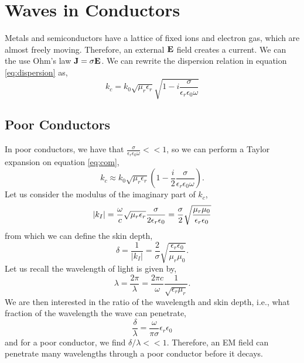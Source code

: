 \documentclass{book}
\begin{document}
\section{Waves in Conductors}
Metals and semiconductors have a lattice of fixed ions and electron gas, which are almost freely moving. Therefore, an external $\vb{E}$ field creates a current. We can the use Ohm's law $\vb{J} = \sigma \vb{E}$. We can rewrite the dispersion relation in equation \eqref{eq:dispersion} as,
\begin{equation}
	k_c = k_0\sqrt{\mu_r\epsilon_r}\sqrt{1 - i\frac{\sigma}{\epsilon_r \epsilon_0 \omega}} \label{eq:com}
\end{equation}
\subsection{Poor Conductors}
In poor conductors, we have that $\frac{\sigma}{\epsilon_r \epsilon_0\omega} <<1$, so we can perform a Taylor expansion on equation \eqref{eq:com},
\begin{equation}
	k_c \approx k_0 \sqrt{\mu_r\epsilon_r}(1 - \frac{i}{2}\frac{\sigma}{\epsilon_r \epsilon_0\omega}).
\end{equation}
Let us consider the modulus of the imaginary part of $k_c$,
\begin{equation}
	\abs{k_I} = \frac{\omega}{c}\sqrt{\mu_r\epsilon_r}\frac{\sigma}{2\epsilon_r \epsilon_0} = \frac{\sigma}{2}\sqrt{\frac{\mu_r\mu_0}{\epsilon_r\epsilon_0}}
\end{equation}
from which we can define the skin depth,
\begin{equation}
	\delta = \frac{1}{|k_I|} = 	\frac{2}{\sigma}\sqrt{\frac{\epsilon_r\epsilon_0}{\mu_r\mu_0}}.
\end{equation}
Let us recall the wavelength of light is given by,
\begin{equation}
	\lambda = \frac{2\pi}{\lambda} = \frac{2\pi c}{\omega}\frac{1}{\sqrt{\epsilon_r\mu_r}}.
\end{equation}
We are then interested in the ratio of the wavelength and skin depth, i.e., what fraction of the wavelength the wave can penetrate,
\begin{equation}
	\frac{\delta}{\lambda} = \frac{\omega}{\pi\sigma}\epsilon_r\epsilon_0
\end{equation}
and for a poor conductor, we find $\delta/\lambda << 1$. Therefore, an EM field can penetrate many wavelengths through a poor conductor before it decays.
\end{document}
